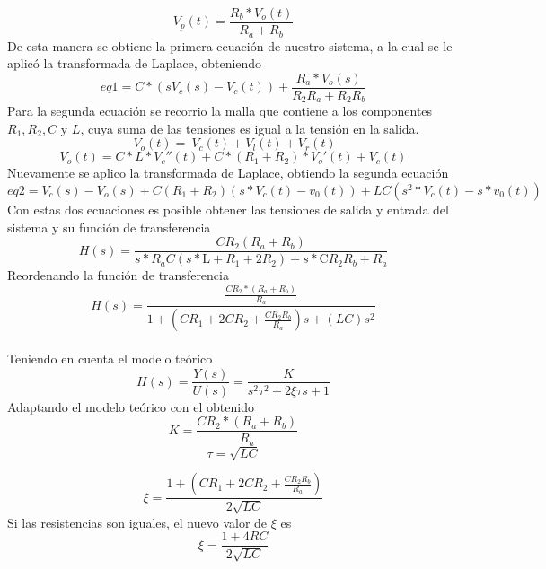 \documentclass[10pt,a4paper]{article} %
\begin{document}
\begin{equation}
V_{p}(t)=\frac{R_{b}* V_{o}(t)}{R_{a}+R_{b}}
\end{equation}
De esta manera se obtiene la primera ecuación de nuestro sistema, a la cual se le aplicó la transformada de Laplace, obteniendo 
\begin{equation}
eq1=C* (s V_{c}(s)-V_{c}(t))+\frac{R_{a}* V_{o}(s)}{R_{2} R_{a} +R_{2} R_{b}}
\end{equation}
Para la segunda ecuación se recorrio la malla que contiene a los componentes $R_{1},R_{2}, C$ y $L$, cuya suma de las tensiones es igual a la tensión en la salida. 
\begin{equation}
\ V_{o}(t)=\ V_{c}(t)+ V_{l}(t)+ V_{r}(t)
\end{equation}
\begin{equation}
V_{o}(t)=C*L*V_{c}''(t)+ C*(R_{1}+R_{2})*V_{o}'(t)+V_{c}(t)
\end{equation}
Nuevamente se aplico la transformada de Laplace, obtiendo la segunda ecuación
\begin{equation}
eq2 = V_{c}(s) - V_{o}(s) + C(R_{1} + R_{2})(s*V_{c}(t) - v_{0}(t)) + 
LC(s^{2}*V_{c}(t) - s*v_{0}(t))
\end{equation}
Con estas dos ecuaciones es posible obtener las tensiones de salida y entrada del sistema y su función de transferencia 
\begin{equation}
H(s)=\frac{C R_{2} (R_{a}+R_{b})}{s*R_{a}C (s*\text{L} +R_{1}+2 R_{2})+s*\text{C}R_{2} R_{b} +R_{a}}
\end{equation}
Reordenando la función de transferencia
\begin{equation}
H(s)=\frac{\frac{CR_{2}*(R_{a}+R_{b})}{R_{a}}}{1+(CR_{1}+2CR_{2}+\frac{CR_{2}R_{b}}{R_{a}})s+(LC)s^{2}}
\end{equation}
\\
Teniendo en cuenta el modelo teórico 
\begin{equation}
H(s)=\dfrac{Y(s)}{U(s)}=\dfrac{K}{s^{2}\tau^{2}+2\xi \tau s+1}
\end{equation}
Adaptando el modelo teórico con el obtenido
\begin{equation}
K=\frac{CR_{2}*(R_{a}+R_{b})}{R_{a}}
\end{equation}
\begin{equation}
\tau=\sqrt{LC}
\end{equation}

\begin{equation}
\xi=\dfrac{1+(CR_{1}+2CR_{2}+\frac{CR_{2}R_{b}}{R_{a}})}{2\sqrt{LC}}
\end{equation}
 Si las resistencias son iguales, el nuevo valor de $\xi$ es 
\begin{equation}
\xi=\dfrac{1+4RC}{2\sqrt{LC}}
\end{equation}
\end{document}
